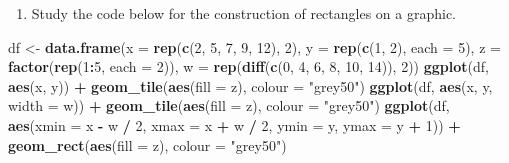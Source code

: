 \documentclass[
]{book}
\newenvironment{Shaded}{\begin{snugshade}}{\end{snugshade}}
\newcommand{\AttributeTok}[1]{\textcolor[rgb]{0.13,0.29,0.53}{#1}}
\newcommand{\DecValTok}[1]{\textcolor[rgb]{0.00,0.00,0.81}{#1}}
\newcommand{\FunctionTok}[1]{\textcolor[rgb]{0.13,0.29,0.53}{\textbf{#1}}}
\newcommand{\NormalTok}[1]{#1}
\newcommand{\OtherTok}[1]{\textcolor[rgb]{0.56,0.35,0.01}{#1}}
\newcommand{\SpecialCharTok}[1]{\textcolor[rgb]{0.81,0.36,0.00}{\textbf{#1}}}
\newcommand{\StringTok}[1]{\textcolor[rgb]{0.31,0.60,0.02}{#1}}
\providecommand{\tightlist}{%
  \setlength{\itemsep}{0pt}\setlength{\parskip}{0pt}}
\begin{document}
\begin{enumerate}
\def\labelenumi{(\alph{enumi})}
\setcounter{enumi}{1}
\tightlist
\item
  Study the code below for the construction of rectangles on a graphic.
\end{enumerate}

\begin{Shaded}
\begin{Highlighting}[]
\NormalTok{df }\OtherTok{\textless{}{-}} \FunctionTok{data.frame}\NormalTok{(}\AttributeTok{x =} \FunctionTok{rep}\NormalTok{(}\FunctionTok{c}\NormalTok{(}\DecValTok{2}\NormalTok{, }\DecValTok{5}\NormalTok{, }\DecValTok{7}\NormalTok{, }\DecValTok{9}\NormalTok{, }\DecValTok{12}\NormalTok{), }\DecValTok{2}\NormalTok{),}
                 \AttributeTok{y =} \FunctionTok{rep}\NormalTok{(}\FunctionTok{c}\NormalTok{(}\DecValTok{1}\NormalTok{, }\DecValTok{2}\NormalTok{), }\AttributeTok{each =} \DecValTok{5}\NormalTok{),}
                 \AttributeTok{z =} \FunctionTok{factor}\NormalTok{(}\FunctionTok{rep}\NormalTok{(}\DecValTok{1}\SpecialCharTok{:}\DecValTok{5}\NormalTok{, }\AttributeTok{each =} \DecValTok{2}\NormalTok{)),}
                 \AttributeTok{w =} \FunctionTok{rep}\NormalTok{(}\FunctionTok{diff}\NormalTok{(}\FunctionTok{c}\NormalTok{(}\DecValTok{0}\NormalTok{, }\DecValTok{4}\NormalTok{, }\DecValTok{6}\NormalTok{, }\DecValTok{8}\NormalTok{, }\DecValTok{10}\NormalTok{, }\DecValTok{14}\NormalTok{)), }\DecValTok{2}\NormalTok{))}
\FunctionTok{ggplot}\NormalTok{(df, }\FunctionTok{aes}\NormalTok{(x, y)) }\SpecialCharTok{+} 
       \FunctionTok{geom\_tile}\NormalTok{(}\FunctionTok{aes}\NormalTok{(}\AttributeTok{fill =}\NormalTok{ z), }\AttributeTok{colour =} \StringTok{"grey50"}\NormalTok{)}
\FunctionTok{ggplot}\NormalTok{(df, }\FunctionTok{aes}\NormalTok{(x, y, }\AttributeTok{width =}\NormalTok{ w)) }\SpecialCharTok{+}
       \FunctionTok{geom\_tile}\NormalTok{(}\FunctionTok{aes}\NormalTok{(}\AttributeTok{fill =}\NormalTok{ z), }\AttributeTok{colour =} \StringTok{"grey50"}\NormalTok{)}
\FunctionTok{ggplot}\NormalTok{(df, }\FunctionTok{aes}\NormalTok{(}\AttributeTok{xmin =}\NormalTok{ x }\SpecialCharTok{{-}}\NormalTok{ w }\SpecialCharTok{/} \DecValTok{2}\NormalTok{, }
               \AttributeTok{xmax =}\NormalTok{ x }\SpecialCharTok{+}\NormalTok{ w }\SpecialCharTok{/} \DecValTok{2}\NormalTok{, }
               \AttributeTok{ymin =}\NormalTok{ y, }\AttributeTok{ymax =}\NormalTok{ y }\SpecialCharTok{+} \DecValTok{1}\NormalTok{)) }\SpecialCharTok{+}
       \FunctionTok{geom\_rect}\NormalTok{(}\FunctionTok{aes}\NormalTok{(}\AttributeTok{fill =}\NormalTok{ z), }\AttributeTok{colour =} \StringTok{"grey50"}\NormalTok{)}
\end{Highlighting}
\end{Shaded}
\end{document}
